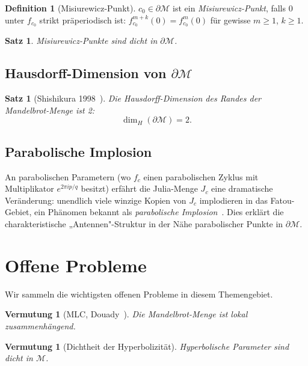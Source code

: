 \documentclass[12pt,a4paper]{amsart}
\newtheorem{satz}[theorem]{Satz}
\newtheorem{vermutung}[theorem]{Vermutung}
\theoremstyle{definition}
\newtheorem{definition_de}[theorem]{Definition}
\theoremstyle{remark}
\begin{document}
\begin{definition_de}[Misiurewicz-Punkt]
$c_0 \in \partial \mathcal{M}$ ist ein \emph{Misiurewicz-Punkt}, falls
$0$ unter $f_{c_0}$ strikt präperiodisch ist: $f_{c_0}^{m+k}(0) = f_{c_0}^m(0)$
für gewisse $m \geq 1$, $k \geq 1$.
\end{definition_de}

\begin{satz}
Misiurewicz-Punkte sind dicht in $\partial \mathcal{M}$.
\end{satz}

\subsection{Hausdorff-Dimension von $\partial\mathcal{M}$}

\begin{satz}[Shishikura 1998~\cite{Shishikura1998}]
Die Hausdorff-Dimension des Randes der Mandelbrot-Menge ist 2:
\[
    \dim_H(\partial \mathcal{M}) = 2.
\]
\end{satz}

\subsection{Parabolische Implosion}

An parabolischen Parametern (wo $f_c$ einen parabolischen Zyklus mit
Multiplikator $e^{2\pi i p/q}$ besitzt) erfährt die Julia-Menge $J_c$
eine dramatische Veränderung: unendlich viele winzige Kopien von $J_c$
implodieren in das Fatou-Gebiet, ein Phänomen bekannt als
\emph{parabolische Implosion}~\cite{LavaursRousseau1993}. Dies erklärt
die charakteristische „Antennen"-Struktur in der Nähe parabolischer
Punkte in $\partial\mathcal{M}$.

\section{Offene Probleme}

Wir sammeln die wichtigsten offenen Probleme in diesem Themengebiet.

\begin{vermutung}[MLC, Douady~\cite{DouadyHubbard1982}]
\label{verm:MLC2}
Die Mandelbrot-Menge ist lokal zusammenhängend.
\end{vermutung}

\begin{vermutung}[Dichtheit der Hyperbolizität]
\label{verm:DHyp}
Hyperbolische Parameter sind dicht in $\mathcal{M}$.
\end{vermutung}
\end{document}
